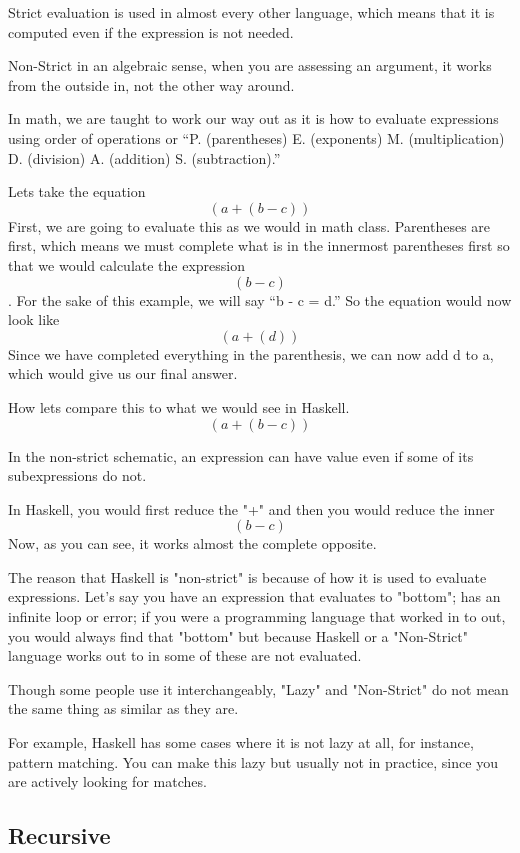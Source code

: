 \documentclass{article}
\begin{document}
\medskip\noindent
Strict evaluation is used in almost every other language, which means that it is computed even if the expression is not needed. 

\medskip\noindent
Non-Strict in an algebraic sense, when you are assessing an argument, it works from the outside in, not the other way around. \cite{NS} 

\medskip\noindent
In math, we are taught to work our way out as it is how to evaluate expressions using order of operations or “P. (parentheses) E. (exponents) M. (multiplication) D. (division) A. (addition) S. (subtraction).” 

\medskip\noindent
Lets take the equation $$(a + (b - c))$$ 
First, we are going to evaluate this as we would in math class. 
Parentheses are first, which means we must complete what is in the innermost parentheses first so that we would calculate the expression $$(b - c)$$. For the sake of this example, we will say “b - c = d.” So the equation would now look like $$(a + (d))$$ Since we have completed everything in the parenthesis, we can now add d to a, which would give us our final answer. 

\medskip\noindent
How lets compare this to what we would see in Haskell. $$(a + (b - c))$$

\medskip\noindent
In the non-strict schematic, an expression can have value even if some of its subexpressions do not. 

\medskip\noindent
In Haskell, you would first reduce the "+" and then you would reduce the inner $$(b - c)$$ Now, as you can see, it works almost the complete opposite.

\medskip\noindent
The reason that Haskell is "non-strict" is because of how it is used to evaluate expressions. Let's say you have an expression that evaluates to "bottom"; has an infinite loop or error; if you were a programming language that worked in to out, you would always find that "bottom" but because Haskell or a "Non-Strict" language works out to in some of these are not evaluated. \cite{LNS}

\medskip\noindent
Though some people use it interchangeably, "Lazy" and "Non-Strict" do not mean the same thing as similar as they are. 

\medskip\noindent
For example, Haskell has some cases where it is not lazy at all, for instance, pattern matching. You can make this lazy but usually not in practice, since you are actively looking for matches. 

\subsection{Recursive}
\end{document}

